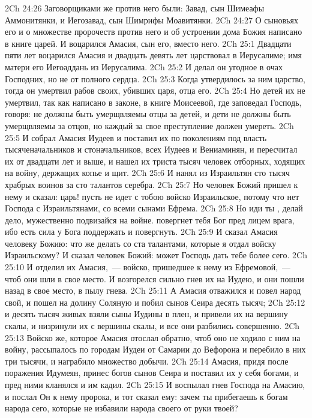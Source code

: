 \vs 2Ch 24:26 Заговорщиками же против него были: Завад, сын Шимеафы Аммонитянки, и Иегозавад, сын Шимрифы Моавитянки.
\vs 2Ch 24:27 О сыновьях его и о множестве пророчеств против него и об устроении дома Божия написано в книге царей. И воцарился Амасия, сын его, вместо него.
\vs 2Ch 25:1 Двадцати пяти лет воцарился Амасия и двадцать девять лет царствовал в Иерусалиме; имя матери его Иегоаддань из Иерусалима.
\vs 2Ch 25:2 И делал он угодное в очах Господних, но не от полного сердца.
\vs 2Ch 25:3 Когда утвердилось за ним царство, тогда он умертвил рабов своих, убивших царя, отца его.
\vs 2Ch 25:4 Но детей их не умертвил, так как написано в законе, в книге Моисеевой, где заповедал Господь, говоря: не должны быть умерщвляемы отцы за детей, и дети не должны быть умерщвляемы за отцов, но каждый за свое преступление должен умереть.
\rsbpar\vs 2Ch 25:5 И собрал Амасия Иудеев и поставил их по поколениям под власть тысяченачальников и стоначальников, всех Иудеев и Вениаминян, и пересчитал их от двадцати лет и выше, и нашел их триста тысяч человек отборных, ходящих на войну, держащих копье и щит.
\vs 2Ch 25:6 И  нанял из Израильтян сто тысяч храбрых воинов за сто талантов серебра.
\vs 2Ch 25:7 Но человек Божий пришел к нему и сказал: царь! пусть не идет с тобою войско Израильское, потому что нет Господа с Израильтянами, со всеми сынами Ефрема.
\vs 2Ch 25:8 Но иди ты , делай дело, мужественно подвизайся на войне.  повергнет тебя Бог пред лицем врага, ибо есть сила у Бога поддержать и повергнуть.
\vs 2Ch 25:9 И сказал Амасия человеку Божию: что же делать со ста талантами, которые я отдал войску Израильскому? И сказал человек Божий: может Господь дать тебе более сего.
\vs 2Ch 25:10 И отделил их Амасия,~--- войско, пришедшее к нему из  Ефремовой,~--- чтоб они шли в свое место. И возгорелся сильно гнев их на Иудею, и они пошли назад в свое место, в пылу гнева.
\vs 2Ch 25:11 А Амасия отважился и повел народ свой, и пошел на долину Соляную и побил сынов Сеира десять тысяч;
\vs 2Ch 25:12 и десять тысяч живых взяли сыны Иудины в плен, и привели их на вершину скалы, и низринули их с вершины скалы, и все они разбились совершенно.
\vs 2Ch 25:13 Войско же, которое Амасия отослал обратно, чтоб оно не ходило с ним на войну, рассыпалось по городам Иудеи от Самарии до Вефорона и перебило в них три тысячи, и награбило множество добычи.
\rsbpar\vs 2Ch 25:14 Амасия, придя после поражения Идумеян, принес богов сынов Сеира и поставил их у себя богами, и пред ними кланялся и им кадил.
\vs 2Ch 25:15 И воспылал гнев Господа на Амасию, и послал Он к нему пророка, и тот сказал ему: зачем ты прибегаешь к богам народа сего, которые не избавили народа своего от руки твоей?
